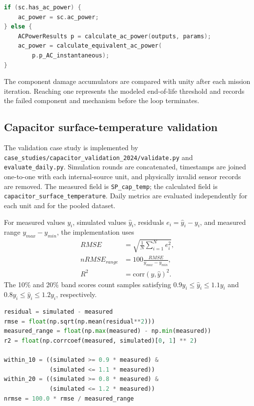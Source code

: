 \documentclass{article}
\begin{document}
\begin{lstlisting}[language=C++,caption={Mission-profile AC-power selection in the simulation loop}]
if (sc.has_ac_power) {
    ac_power = sc.ac_power;
} else {
    ACPowerResults p = calculate_ac_power(outputs, params);
    ac_power = calculate_equivalent_ac_power(
        p.p_AC_instantaneous);
}
\end{lstlisting}

The component damage accumulators are compared with unity after each mission
iteration.  Reaching one represents the modeled end-of-life threshold and
records the failed component and mechanism before the loop terminates.

\subsection{Capacitor surface-temperature validation}
\label{sec:implementation-validation}
The validation case study is implemented by
\texttt{case\_studies/capacitor\_validation\_2024/validate.py} and
\texttt{evaluate\_daily.py}.  Simulation rounds are concatenated, timestamps are
joined one-to-one with each internal-source unit, and physically invalid sensor
records are removed.  The measured field is \texttt{SP\_cap\_temp}; the calculated
field is \texttt{capacitor\_surface\_temperature}.  Daily metrics are evaluated
independently for each unit and for the pooled dataset.

For measured values $y_i$, simulated values $\hat y_i$, residuals
$e_i=\hat y_i-y_i$, and measured range $y_{max}-y_{min}$, the implementation uses
\begin{align}
RMSE &= \sqrt{\frac{1}{N}\sum_{i=1}^{N}e_i^2},\\
nRMSE_{range} &= 100\frac{RMSE}{y_{max}-y_{min}},\\
R^2 &= \mathrm{corr}(y,\hat y)^2.
\end{align}
The 10\% and 20\% band scores count samples satisfying
$0.9y_i\leq\hat y_i\leq1.1y_i$ and
$0.8y_i\leq\hat y_i\leq1.2y_i$, respectively.

\begin{lstlisting}[language=Python,caption={Daily accuracy metrics and tolerance-band coverage}]
residual = simulated - measured
rmse = float(np.sqrt(np.mean(residual**2)))
measured_range = float(np.max(measured) - np.min(measured))
r2 = float(np.corrcoef(measured, simulated)[0, 1] ** 2)

within_10 = ((simulated >= 0.9 * measured) &
             (simulated <= 1.1 * measured))
within_20 = ((simulated >= 0.8 * measured) &
             (simulated <= 1.2 * measured))
nrmse = 100.0 * rmse / measured_range
\end{lstlisting}
\end{document}
